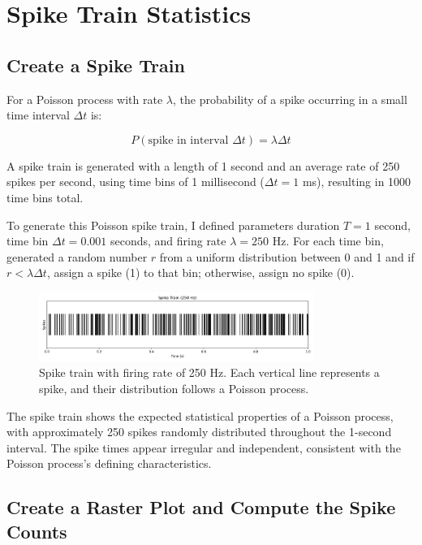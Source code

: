\documentclass{article}
\begin{document}
\section{Spike Train Statistics}

\subsection{Create a Spike Train}

For a Poisson process with rate $\lambda$, the probability of a spike occurring in a small time interval $\Delta t$ is:

\begin{equation}
    P(\text{spike in interval } \Delta t) = \lambda \Delta t
\end{equation}

A spike train is generated with a length of 1 second and an average rate of 250 spikes per second, using time bins of 1 millisecond ($\Delta t = 1$ ms), resulting in 1000 time bins total.

To generate this Poisson spike train, I defined parameters duration $T = 1$ second, time bin $\Delta t = 0.001$ seconds, and firing rate $\lambda = 250$ Hz.
For each time bin, generated a random number $r$ from a uniform distribution between 0 and 1 and if $r < \lambda \Delta t$, assign a spike (1) to that bin; otherwise, assign no spike (0).



\begin{figure}[H]
\centering
\includegraphics[width=0.8\textwidth]{Fig1.png}
\caption{Spike train with firing rate of 250 Hz. Each vertical line represents a spike, and their distribution follows a Poisson process.}
\label{fig:spike_train}
\end{figure}

The spike train shows the expected statistical properties of a Poisson process, with approximately 250 spikes randomly distributed throughout the 1-second interval. The spike times appear irregular and independent, consistent with the Poisson process's defining characteristics.

\subsection{Create a Raster Plot and Compute the Spike Counts}
\end{document}
